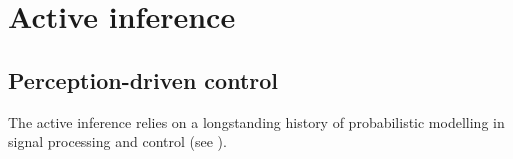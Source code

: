 \documentclass{article}
\begin{document}

\section{Active inference}


\subsection{Perception-driven control}

The active inference relies on a longstanding history of probabilistic modelling in signal processing and control (see \cite{Kalman1960,Baum1966,friston1994statistical}). 
\end{document}
